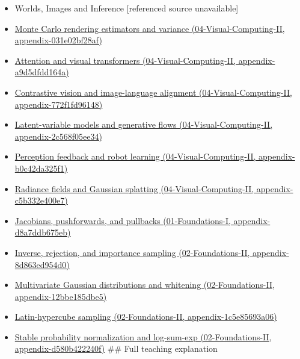 \begin{itemize}
\item
  {Worlds, Images and Inference {[}referenced source unavailable{]}}
\item
  \href{../04-Visual-Computing-II/main.pdf\#nameddest=appendix-031e02bf28af}{Monte Carlo rendering estimators and variance (04-Visual-Computing-II, appendix-031e02bf28af)}
\item
  \href{../04-Visual-Computing-II/main.pdf\#nameddest=appendix-a9d5dfdd164a}{Attention and visual transformers (04-Visual-Computing-II, appendix-a9d5dfdd164a)}
\item
  \href{../04-Visual-Computing-II/main.pdf\#nameddest=appendix-772f1fd96148}{Contrastive vision and image-language alignment (04-Visual-Computing-II, appendix-772f1fd96148)}
\item
  \href{../04-Visual-Computing-II/main.pdf\#nameddest=appendix-2c568f05ee34}{Latent-variable models and generative flows (04-Visual-Computing-II, appendix-2c568f05ee34)}
\item
  \href{../04-Visual-Computing-II/main.pdf\#nameddest=appendix-b0c42da325f1}{Perception feedback and robot learning (04-Visual-Computing-II, appendix-b0c42da325f1)}
\item
  \href{../04-Visual-Computing-II/main.pdf\#nameddest=appendix-c5b332e400e7}{Radiance fields and Gaussian splatting (04-Visual-Computing-II, appendix-c5b332e400e7)}
\item
  \href{../01-Foundations-I/main.pdf\#nameddest=appendix-d8a7ddb675eb}{Jacobians, pushforwards, and pullbacks (01-Foundations-I, appendix-d8a7ddb675eb)}
\item
  \href{../02-Foundations-II/main.pdf\#nameddest=appendix-8d863ed954d0}{Inverse, rejection, and importance sampling (02-Foundations-II, appendix-8d863ed954d0)}
\item
  \href{../02-Foundations-II/main.pdf\#nameddest=appendix-12bbe185dbe5}{Multivariate Gaussian distributions and whitening (02-Foundations-II, appendix-12bbe185dbe5)}
\item
  \href{../02-Foundations-II/main.pdf\#nameddest=appendix-1c5e85693a06}{Latin-hypercube sampling (02-Foundations-II, appendix-1c5e85693a06)}
\item
  \href{../02-Foundations-II/main.pdf\#nameddest=appendix-d580b422240f}{Stable probability normalization and log-sum-exp (02-Foundations-II, appendix-d580b422240f)} \#\# Full teaching explanation
\end{itemize}

